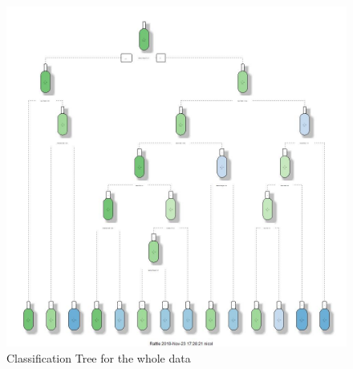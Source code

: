 \documentclass[]{article}
\begin{document}
\begin{figure}
\centering
\includegraphics{../../Project_Scripts/Togtree.jpg}
\caption{Classification Tree for the whole data}
\end{figure}
\end{document}
